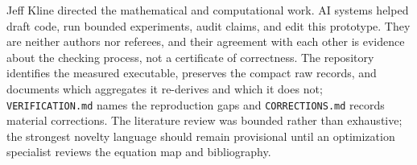 \documentclass[10pt,letterpaper]{article}
\newcommand{\code}[1]{\texttt{#1}}
\begin{document}
Jeff Kline directed the mathematical and computational work. AI systems helped draft code, run bounded experiments, audit claims, and edit this prototype. They are neither authors nor referees, and their agreement with each other is evidence about the checking process, not a certificate of correctness. The repository identifies the measured executable, preserves the compact raw records, and documents which aggregates it re-derives and which it does not; \code{VERIFICATION.md} names the reproduction gaps and \code{CORRECTIONS.md} records material corrections. The literature review was bounded rather than exhaustive; the strongest novelty language should remain provisional until an optimization specialist reviews the equation map and bibliography.


\renewcommand{\bibfont}{\footnotesize}
\setlength{\bibsep}{2pt plus 0.3ex}

\end{document}
